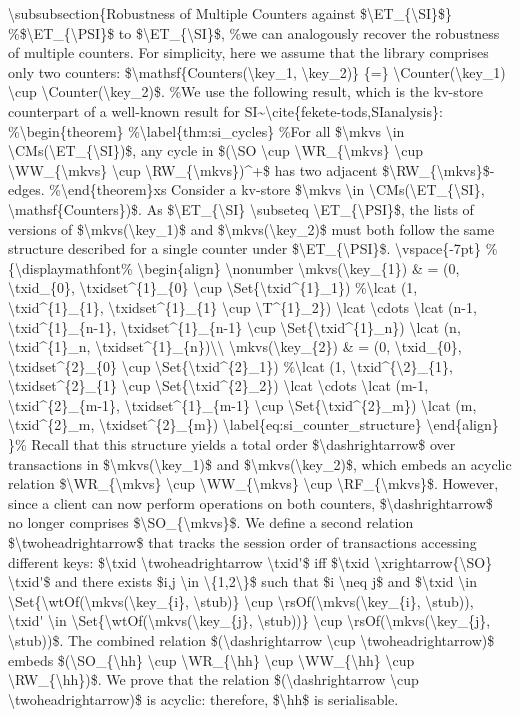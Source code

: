 \ac{
\subsubsection{Robustness of Multiple Counters against $\ET_{\SI}$} 
For simplicity, here we assume that the library comprises only two counters: 
$\mathsf{Counters(\key_1, \key_2)} {=} \Counter(\key_1) \cup \Counter(\key_2)$.
Consider a kv-store $\mkvs \in \CMs(\ET_{\SI}, \mathsf{Counters})$. 
As $\ET_{\SI} \subseteq \ET_{\PSI}$, the lists of versions of $\mkvs(\key_1)$ and $\mkvs(\key_2)$ 
must both follow the same structure described for a single counter under $\ET_{\PSI}$. 

\vspace{-7pt}
%
{\displaymathfont%
\begin{align}
\nonumber
\mkvs(\key_{1}) & = (0, \txid_{0}, \txidset^{1}_{0} \cup \Set{\txid^{1}_1}) 
	\lcat \cdots \lcat (n-1, \txid^{1}_{n-1}, \txidset^{1}_{n-1} \cup \Set{\txid^{1}_n})
	\lcat (n, \txid^{1}_n, \txidset^{1}_{n})\\
\mkvs(\key_{2}) & = (0, \txid_{0}, \txidset^{2}_{0} \cup \Set{\txid^{2}_1}) 
	\lcat \cdots \lcat (m-1, \txid^{2}_{m-1}, \txidset^{1}_{m-1} \cup \Set{\txid^{2}_m})
	\lcat (m, \txid^{2}_m, \txidset^{2}_{m}) \label{eq:si_counter_structure}
\end{align}
}%
Recall that this structure yields a total order $\dashrightarrow$ over transactions in $\mkvs(\key_1)$ and $\mkvs(\key_2)$, 
which embeds an acyclic relation $\WR_{\mkvs} \cup \WW_{\mkvs} \cup \RF_{\mkvs}$. 
However, since a client can now perform operations on both counters, $\dashrightarrow$ no longer comprises $\SO_{\mkvs}$. 

We define a second relation $\twoheadrightarrow$ that tracks the session order of transactions accessing different keys: 
$\txid \twoheadrightarrow \txid'$ iff $\txid \xrightarrow{\SO} \txid'$ and there exists $i,j \in \{1,2\}$ such that
$i \neq j$ and $\txid \in \Set{\wtOf(\mkvs(\key_{i}, \stub)} \cup \rsOf(\mkvs(\key_{i}, \stub)),  
\txid' \in \Set{\wtOf(\mkvs(\key_{j}, \stub))} \cup \rsOf(\mkvs(\key_{j}, \stub))$.
The combined relation $(\dashrightarrow \cup \twoheadrightarrow)$ embeds 
$(\SO_{\hh} \cup \WR_{\hh} \cup \WW_{\hh} \cup \RW_{\hh})$. We prove that the relation $(\dashrightarrow \cup \twoheadrightarrow)$ 
is acyclic: therefore, $\hh$ is serialisable. 

}
